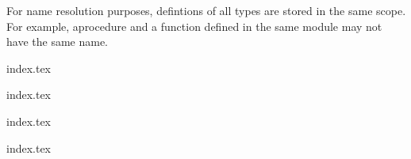 For name resolution purposes, defintions of all types are stored in the same
scope. For example, aprocedure and a function defined in the same module may
not have the same name.

{index.tex}

{index.tex}

{index.tex}

{index.tex}
